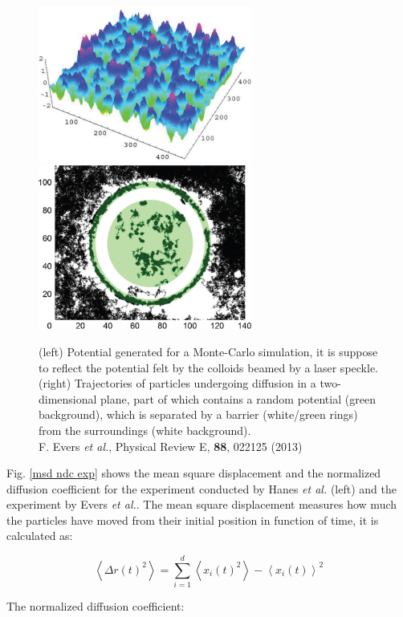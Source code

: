 \documentclass[a4paper,12pt]{article}
\newcommand{\etal}{\textit{et al.}}
\begin{document}
\begin{figure}[htbp]
\centering
\subfigure
{\includegraphics[width=7cm]{pics/optic_pot.png}}
\subfigure
{\includegraphics[width=7cm]{pics/colloids.png}}
\caption{(left) Potential generated for a Monte-Carlo simulation, it is suppose to reflect the potential felt by the colloids beamed by a laser
speckle.\\(right) Trajectories of particles undergoing diffusion in a two-dimensional plane, part of which contains a random potential (green
background), which is separated by a barrier (white/green rings) from the surroundings (white background).\\ \small F. Evers \etal, Physical 
Review E, \textbf{88}, 022125 (2013)}
\label{potential and colloids}
\end{figure}

Fig. \ref{msd ndc  exp} shows the mean square displacement and the normalized diffusion coefficient for the experiment conducted by Hanes \etal
(left) and the experiment by Evers \etal. The mean square displacement measures how much the particles have moved from their initial position 
in function of time, it is calculated as:

\begin{equation}
\left< \Delta r(t)^2\right> = \sum_{i=1}^d \left< x_i(t)^2 \right>  - \left< x_i(t) \right>^2
\end{equation}

The normalized diffusion coefficient:
\end{document}
